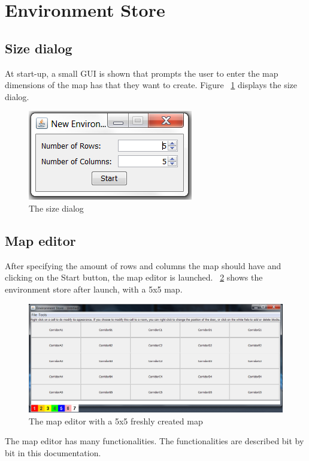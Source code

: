 \section{Environment Store}
\subsection{Size dialog}
At start-up, a small GUI is shown that prompts the user to enter the map dimensions of the map has that they want to create. Figure ~\ref{fig:sizeDialog} displays the size dialog.
\begin{figure}[h]
	\includegraphics{NewFeatures/SizeDialog.png}
\caption{The size dialog}
\label{fig:sizeDialog}
\end{figure}
\subsection{Map editor}
After specifying the amount of rows and columns the map should have and clicking on the Start button, the map editor is launched. ~\ref{fig:mapEditor} shows the environment store after launch, with a 5x5 map.
\begin{figure}[h]
	\includegraphics[scale=0.55]{NewFeatures/MapEditor.png}
\caption{The map editor with a 5x5 freshly created map}
\label{fig:mapEditor}
\end{figure}
The map editor has many functionalities. The functionalities are described bit by bit in this documentation.
